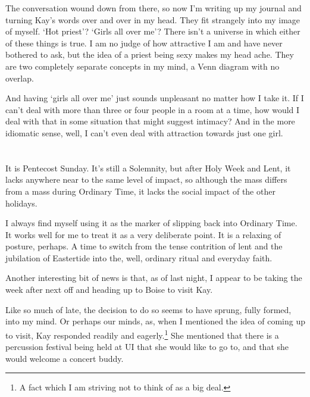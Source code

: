 

\vspace{10pt}

The conversation wound down from there, so now I'm writing up my journal and turning Kay's words over and over in my head. They fit strangely into my image of myself. `Hot priest'? `Girls all over me'? There isn't a universe in which either of these things is true. I am no judge of how attractive I am and have never bothered to ask, but the idea of a priest being sexy makes my head ache. They are two completely separate concepts in my mind, a Venn diagram with no overlap.

And having `girls all over me' just sounds unpleasant no matter how I take it. If I can't deal with more than three or four people in a room at a time, how would I deal with that in some situation that might suggest intimacy? And in the more idiomatic sense, well, I can't even deal with attraction towards just one girl.

\section{}

It is Pentecost Sunday. It's still a Solemnity, but after Holy Week and Lent, it lacks anywhere near to the same level of impact, so although the mass differs from a mass during Ordinary Time, it lacks the social impact of the other holidays.

I always find myself using it as the marker of slipping back into Ordinary Time. It works well for me to treat it as a very deliberate point. It is a relaxing of posture, perhaps. A time to switch from the tense contrition of lent and the jubilation of Eastertide into the, well, ordinary ritual and everyday faith.

Another interesting bit of news is that, as of last night, I appear to be taking the week after next off and heading up to Boise to visit Kay.

Like so much of late, the decision to do so seems to have sprung, fully formed, into my mind. Or perhaps our minds, as, when I mentioned the idea of coming up to visit, Kay responded readily and eagerly.\footnote{A fact which I am striving not to think of as a big deal.} She mentioned that there is a percussion festival being held at UI that she would like to go to, and that she would welcome a concert buddy.

